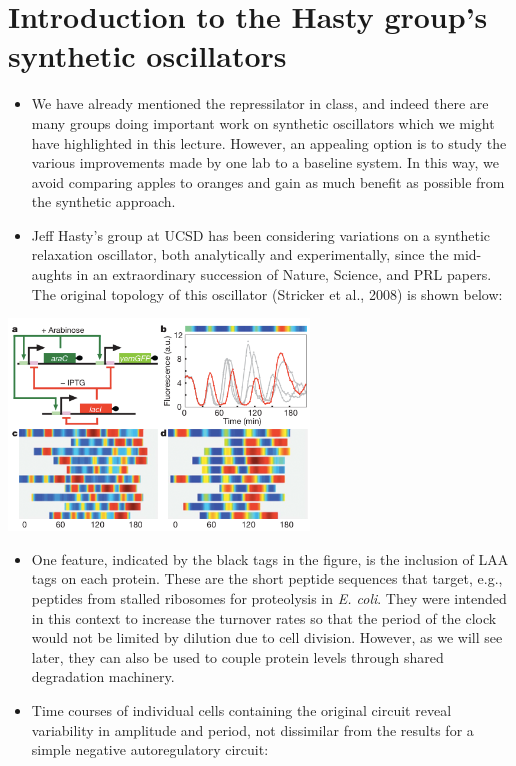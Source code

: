 \documentclass{article}
\begin{document}
\section*{Introduction to the Hasty group's synthetic oscillators}
\begin{itemize}
\item We have already mentioned the repressilator in class, and indeed there are many groups doing important work on synthetic oscillators which we might have highlighted in this lecture. However, an appealing option is to study the various improvements made by one lab to a baseline system. In this way, we avoid comparing apples to oranges and gain as much benefit as possible from the synthetic approach.
\item Jeff Hasty's group at UCSD has been considering variations on a synthetic relaxation oscillator, both analytically and experimentally, since the mid-aughts in an extraordinary succession of Nature, Science, and PRL papers. The original topology of this oscillator (Stricker et al., 2008) is shown below:
\end{itemize}
\begin{center}
\includegraphics[width=0.6\textwidth]{stricker_trace.png}
\end{center}
\begin{itemize}
\item One feature, indicated by the black tags in the figure, is the inclusion of LAA tags on each protein. These are the short peptide sequences that target, e.g., peptides from stalled ribosomes for proteolysis in \textit{E. coli}. They were intended in this context to increase the turnover rates so that the period of the clock would not be limited by dilution due to cell division. However, as we will see later, they can also be used to couple protein levels through shared degradation machinery.
\item Time courses of individual cells containing the original circuit reveal variability in amplitude and period, not dissimilar from the results for a simple negative autoregulatory circuit:
\end{itemize}
\end{document}
